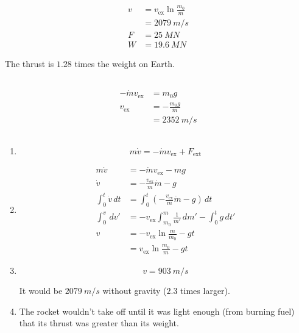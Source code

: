 \documentclass{article}
\begin{document}
\setcounter{subsection}{6}
\subsection{}

\begin{align*}
  v & = v_\text{ex} \ln \frac{m_0}{m} \\
    & = \qty{2079}{m/s}               \\
  F & = \qty{25}{MN}                  \\
  W & = \qty{19.6}{MN}
\end{align*}

The thrust is $1.28$ times the weight on Earth.

\setcounter{subsection}{8}
\subsection{}

\begin{align*}
  -\dot{m} v_\text{ex} & = m_0 g                  \\
  v_\text{ex}          & = -\frac{m_0 g}{\dot{m}} \\
                       & = \qty{2352}{m/s}
\end{align*}

\setcounter{subsection}{10}
\subsection{}

\begin{enumerate}
  \item \[m \dot{v} = -\dot{m} v_\text{ex} + F_\text{ext}\]

  \item

        \begin{align*}
          m \dot{v}              & = -\dot{m} v_\text{ex} - m g                                        \\
          \dot{v}                & = -\frac{v_\text{ex}}{m} \dot{m} - g                                \\
          \int_0^t \dot{v} \,d t & = \int_0^t \left( -\frac{v_\text{ex}}{m} \dot{m} - g \right) \,d t  \\
          \int_0^v \,d v'        & = -v_\text{ex} \int_{m_0}^m \frac{1}{m'} \,d m' - \int_0^t g \,d t' \\
          v                      & = -v_\text{ex} \ln \frac{m}{m_0} - g t                              \\
                                 & = v_\text{ex} \ln \frac{m_0}{m} - g t
        \end{align*}

  \item \[v = \qty{903}{m/s}\]

        It would be $\qty{2079}{m/s}$ without gravity ($2.3$ times larger).

  \item The rocket wouldn't take off until it was light enough (from burning fuel) that its thrust was greater than its weight.
\end{enumerate}
\end{document}
